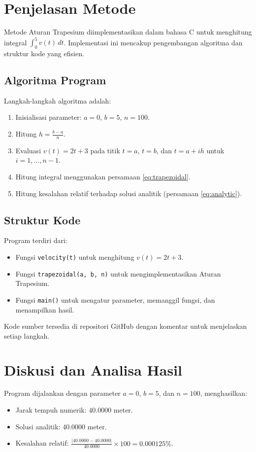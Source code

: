 \documentclass[conference]{IEEEtran}
\begin{document}
\section{Penjelasan Metode}
Metode Aturan Trapesium diimplementasikan dalam bahasa C untuk menghitung integral \( \int_0^5 v(t) \, dt \). Implementasi ini mencakup pengembangan algoritma dan struktur kode yang efisien.

\subsection{Algoritma Program}
Langkah-langkah algoritma adalah:
\begin{enumerate}
    \item Inisialisasi parameter: \( a = 0 \), \( b = 5 \), \( n = 100 \).
    \item Hitung \( h = \frac{b-a}{n} \).
    \item Evaluasi \( v(t) = 2t + 3 \) pada titik \( t = a \), \( t = b \), dan \( t = a + i h \) untuk \( i = 1, \ldots, n-1 \).
    \item Hitung integral menggunakan persamaan \eqref{eq:trapezoidal}.
    \item Hitung kesalahan relatif terhadap solusi analitik (persamaan \eqref{eq:analytic}).
\end{enumerate}

\subsection{Struktur Kode}
Program terdiri dari:
\begin{itemize}
    \item Fungsi \texttt{velocity(t)} untuk menghitung \( v(t) = 2t + 3 \).
    \item Fungsi \texttt{trapezoidal(a, b, n)} untuk mengimplementasikan Aturan Trapesium.
    \item Fungsi \texttt{main()} untuk mengatur parameter, memanggil fungsi, dan menampilkan hasil.
\end{itemize}
Kode sumber tersedia di repositori GitHub \cite{b2} dengan komentar untuk menjelaskan setiap langkah.

\section{Diskusi dan Analisa Hasil}
Program dijalankan dengan parameter \( a = 0 \), \( b = 5 \), dan \( n = 100 \), menghasilkan:
\begin{itemize}
    \item Jarak tempuh numerik: 40.0000 meter.
    \item Solusi analitik: 40.0000 meter.
    \item Kesalahan relatif: \( \frac{|40.0000 - 40.0000|}{40.0000} \times 100 = 0.000125\% \).
\end{itemize}
\end{document}
